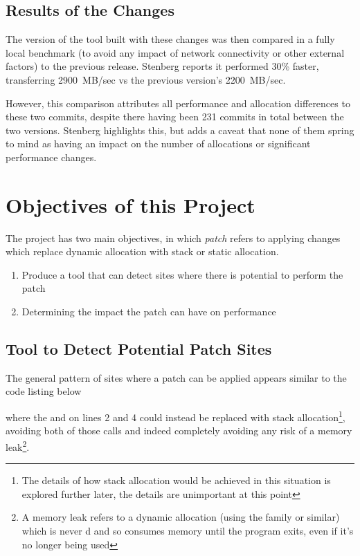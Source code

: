 \subsection{Results of the Changes}

The version of the tool built with these changes was then compared in a fully local benchmark (to avoid any impact of network connectivity or other external factors) to the previous release. Stenberg reports it performed 30\% faster, transferring 2900~MB/sec vs the previous version's 2200~MB/sec.

However, this comparison attributes all performance and allocation differences to these two commits, despite there having been 231 commits in total between the two versions. Stenberg highlights this, but adds a caveat that none of them spring to mind as having an impact on the number of allocations or significant performance changes.

\section{Objectives of this Project}

The project has two main objectives, in which \textit{patch} refers to applying changes which replace dynamic allocation with stack or static allocation.

\begin{enumerate}
	\item Produce a tool that can detect sites where there is potential to perform the patch
	\item Determining the impact the patch can have on performance
\end{enumerate}

\subsection{Tool to Detect Potential Patch Sites}

The general pattern of sites where a patch can be applied appears similar to the code listing below



where the \malloc{} and \free{} on lines 2 and 4 could instead be replaced with stack allocation\footnote{The details of how stack allocation would be achieved in this situation is explored further later, the details are unimportant at this point}, avoiding both of those calls and indeed completely avoiding any risk of a memory leak\footnote{A memory leak refers to a dynamic allocation (using the \malloc{} family or similar) which is never \free{}d and so consumes memory until the program exits, even if it's no longer being used}.

